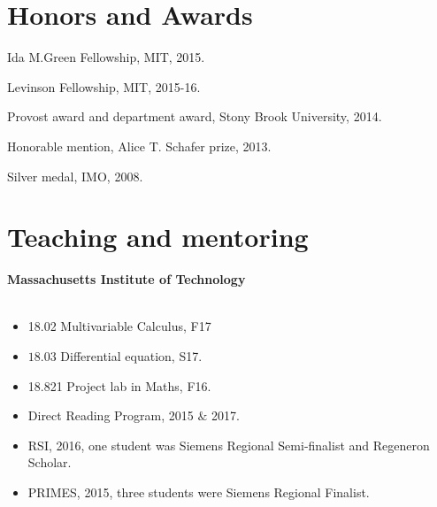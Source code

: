 \documentclass[margin,line]{res}
\begin{document}
\begin{resume}
\section{\sc Honors and Awards}
Ida M.Green Fellowship, MIT, 2015.

\vspace*{-2.5mm}
Levinson Fellowship, MIT, 2015-16.



%
\vspace*{-2.5mm}
Provost award and department award, Stony Brook University, 2014.

\vspace*{-2.5mm}
Honorable mention, Alice T. Schafer prize, 2013.

\vspace*{-2.5mm}
Silver medal, IMO, 2008.

\section{\sc Teaching and mentoring}



{\bf Massachusetts Institute of Technology}\\
\vspace{-.3cm}
\\
\begin{itemize}
\item[] 18.02 Multivariable Calculus, F17
\item[] $18.03$ Differential equation, S17.
\item[] 18.821 Project lab in Maths, F16.
\end{itemize}

\vspace{-.3cm}
\begin{itemize}
\item[] Direct Reading Program, 2015 $\&$ 2017.
\item[] RSI, 2016, one student was Siemens Regional Semi-finalist and Regeneron Scholar.
\item[] PRIMES, 2015, three students were Siemens Regional Finalist.
\end{itemize}


\end{resume}
\end{document}
